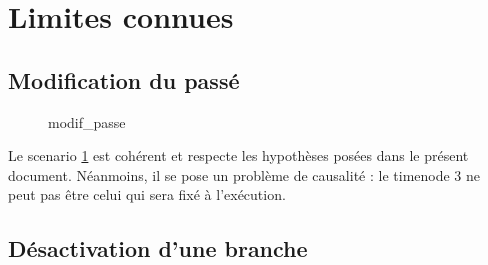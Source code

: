\documentclass[10pt,a4paper]{article}
\begin{document}
\section{Limites connues}

	\subsection{Modification du passé}

	\begin{figure}[htp]
		\centering
		
		\schemaScenario modif_passe
		\caption{}
		\label{S:modif_passe}
	\end{figure}
	
Le scenario \ref{S:modif_passe} est cohérent et respecte les hypothèses posées dans le présent document. Néanmoins, il se pose un problème de causalité : le timenode 3 ne peut pas être celui qui sera fixé à l'exécution.

	\subsection{Désactivation d'une branche}
\end{document}
